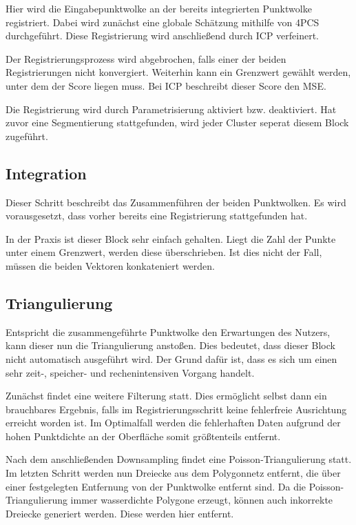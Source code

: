 Hier wird die Eingabepunktwolke an der bereits integrierten Punktwolke registriert.
Dabei wird zunächst eine globale Schätzung mithilfe von \ac{4PCS} durchgeführt.
Diese Registrierung wird anschließend durch \ac{ICP} verfeinert.

Der Registrierungsprozess wird abgebrochen, falls einer der beiden Registrierungen nicht konvergiert.
Weiterhin kann ein Grenzwert gewählt werden, unter dem der Score liegen muss.
Bei \ac{ICP} beschreibt dieser Score den \ac{MSE}.

Die Registrierung wird durch Parametrisierung aktiviert bzw. deaktiviert.
Hat zuvor eine Segmentierung stattgefunden, wird jeder Cluster seperat diesem Block zugeführt.


\subsection{Integration}
\label{subsec:pipeline-integration}

Dieser Schritt beschreibt das Zusammenführen der beiden Punktwolken.
Es wird vorausgesetzt, dass vorher bereits eine Registrierung stattgefunden hat.

In der Praxis ist dieser Block sehr einfach gehalten.
Liegt die Zahl der Punkte unter einem Grenzwert, werden diese überschrieben.
Ist dies nicht der Fall, müssen die beiden Vektoren konkateniert werden.


\subsection{Triangulierung}
\label{subsec:pipeline-triangulierung}

Entspricht die zusammengeführte Punktwolke den Erwartungen des Nutzers, kann dieser nun die Triangulierung anstoßen.
Dies bedeutet, dass dieser Block nicht automatisch ausgeführt wird.
Der Grund dafür ist, dass es sich um einen sehr zeit-, speicher- und rechenintensiven Vorgang handelt.

Zunächst findet eine weitere Filterung statt.
Dies ermöglicht selbst dann ein brauchbares Ergebnis, falls im Registrierungsschritt keine fehlerfreie Ausrichtung erreicht worden ist.
Im Optimalfall werden die fehlerhaften Daten aufgrund der hohen Punktdichte an der Oberfläche somit größtenteils entfernt.

Nach dem anschließenden Downsampling findet eine Poisson-Triangulierung statt.
Im letzten Schritt werden nun Dreiecke aus dem Polygonnetz entfernt, die über einer festgelegten Entfernung von der Punktwolke entfernt sind.
Da die Poisson-Triangulierung immer wasserdichte Polygone erzeugt, können auch inkorrekte Dreiecke generiert werden.
Diese werden hier entfernt.
